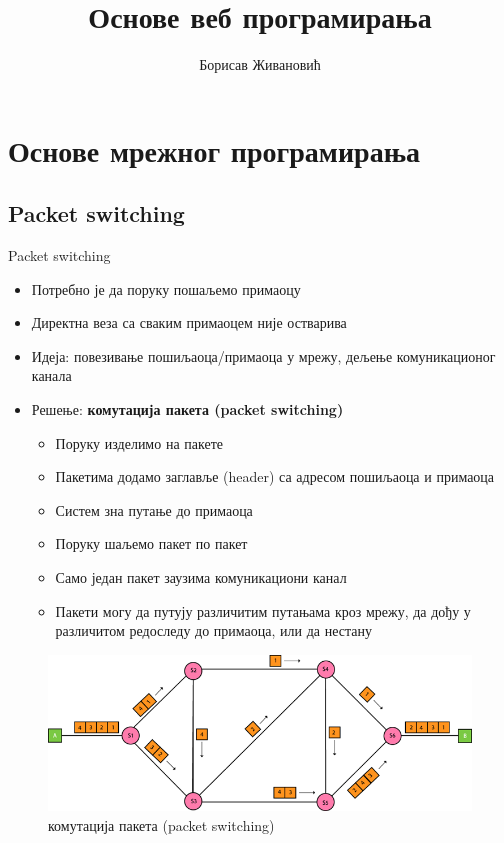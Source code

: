 \documentclass[aspectratio=169]{beamer}
\title{Основе веб програмирања}
\author{Борисав Живановић}
\begin{document}
    \begin{frame}
        \maketitle
    \end{frame}

    \section{Основе мрежног програмирања}
    \subsection[]{Packet switching}

    \begin{frame}[allowframebreaks]{Packet switching}
        \begin{itemize}
            \item Потребно је да поруку пошаљемо примаоцу
            \item Директна веза са сваким примаоцем није остварива
            \item Идеја: повезивање пошиљаоца/примаоца у мрежу, дељење комуникационог канала
            \item Решење: \textbf{комутација пакета (packet switching)}
            \begin{itemize}
                \item Поруку изделимо на пакете
                \item Пакетима додамо заглавље (header) са адресом пошиљаоца и примаоца
                \item Систем зна путање до примаоца
                \item Поруку шаљемо пакет по пакет
                \item Само један пакет заузима комуникациони канал
                \item Пакети могу да путују различитим путањама кроз мрежу, да дођу у различитом редоследу до примаоца, или да нестану
            \end{itemize}
        \end{itemize}

        \framebreak

        \begin{figure}
            \centering
            \includegraphics[width=\textwidth,height=0.8\textheight,keepaspectratio]{images/pcsw.png}
            \caption{комутација пакета (packet switching)}
            \label{fig:pcsw}
        \end{figure}
    \end{frame}
\end{document}
